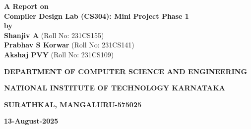 \documentclass[12pt]{article}
\newlength{\defbaselineskip}
\newcommand{\setlinespacing}[1]{\setlength{\baselineskip}{#1 \defbaselineskip}}
\begin{document}
\begin{titlepage}
\setlinespacing{2}
\thispagestyle{empty}

\begin{center}
{\fontsize{22}{26.4}\textbf{A Report on\\ Compiler Design Lab (CS304): Mini Project Phase 1}}\\


\textbf{by}\\
{\textbf{Shanjiv A}} (Roll No: 231CS155)\\
\vspace{0.5cm}
{\textbf{Prabhav S Korwar}} (Roll No: 231CS141)\\
\vspace{0.5cm}
{\textbf{Akshaj PVY}} (Roll No: 231CS109)\\


\vspace{0.3cm}
\begin{figure}[h] 
{\par}
\end{figure} 

\setlinespacing{2}
\vspace{0.3cm}



{\textbf{DEPARTMENT OF COMPUTER SCIENCE AND ENGINEERING}\par}
\vspace{-12pt}
{\textbf{NATIONAL INSTITUTE OF TECHNOLOGY KARNATAKA}\par}
\vspace{-12pt}
{\textbf{SURATHKAL, MANGALURU-575025}\par}
\vspace{-12pt}
{\textbf{13-August-2025}\par}



\end{center}
\pagebreak
\end{titlepage}
\end{document}
